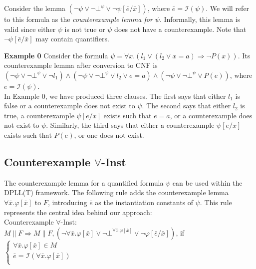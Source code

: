 \documentclass{llncs}
\begin{document}
Consider the lemma $( \neg \psi \vee \neg \bot^\psi \vee \neg \psi[\bar{e}/\bar{x}])$, where $\bar{e} = \mathcal{I}( \psi )$.
We will refer to this formula as the \emph{counterexample lemma for $\psi$}.
Informally, this lemma is valid since either $\psi$ is not true or $\psi$ does not have a counterexample.
Note that $\neg \psi[\bar{e}/\bar{x}]$ may contain quantifiers.

{\bf Example 0}
Consider the formula $\psi = \forall x. ( l_1 \vee ( l_2 \vee x = a ) \Rightarrow \neg P( x ) )$.
Its counterexample lemma after conversion to CNF is $( \neg \psi \vee \neg \bot^\psi \vee \neg l_1 ) \wedge ( \neg \psi \vee \neg \bot^\psi \vee l_2 \vee e = a ) \wedge ( \neg \psi \vee \neg \bot^\psi \vee P( e ) ) $, where $e = \mathcal{I}( \psi )$. \\

In Example 0, we have produced three clauses.
The first says that either $l_1$ is false or a counterexample does not exist to $\psi$.
The second says that either $l_2$ is true, a counterexample $\psi[e/x]$ exists such that $e = a$, or a counterexample does not exist to $\psi$. 
Similarly, the third says that either a counterexample $\psi[e/x]$ exists such that $P( e )$, or one does not exist.

\subsection{Counterexample $\forall$-Inst}

The counterexample lemma for a quantified formula $\psi$ can be used within the DPLL(T) framework.
The following rule adds the counterexample lemma $\forall \bar{x}. \varphi[ \bar{ x } ]$ to $F$, introducing $\bar{e}$ as the instantiation constants of $\psi$.
This rule represents the central idea behind our approach: \\

\noindent Counterexample $\forall$-Inst: \\

$M \parallel F \Longrightarrow M \parallel F, (\neg \forall \bar{x}. \varphi[ \bar{x} ] \vee \neg \bot^{\forall \bar{x}. \varphi[ \bar{x} ]} \vee \neg \varphi[ \bar{ e }/\bar{x} ])$, if   
$\begin{cases}
  \forall \bar{x}. \varphi[ \bar{ x } ] \in M \\
  \bar{ e } = \mathcal{I}( \forall \bar{x}. \varphi[ \bar{ x } ] ) \\
\end{cases}$ \\
\end{document}
